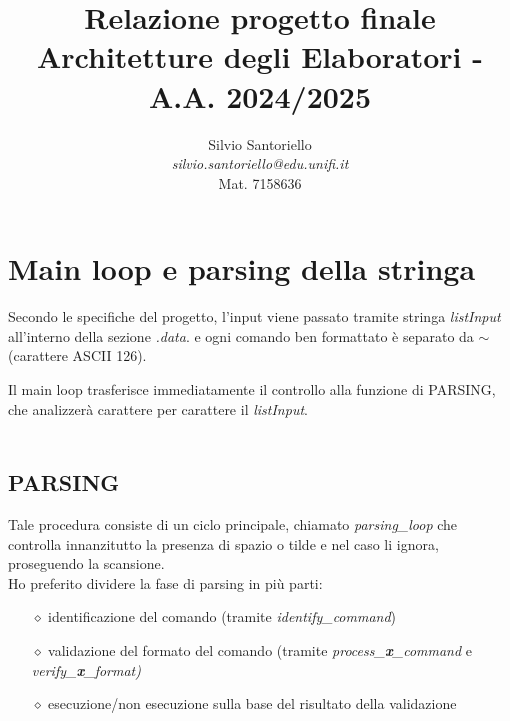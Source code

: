 \documentclass[10pt]{article}
\title{Relazione progetto finale Architetture degli Elaboratori - A.A. 2024/2025}
\date{}
\begin{document}
   
    \maketitle
    \begin{center}
        {}
    \end{center}

    \begin{center}
        \vspace{9cm}
        \author{Silvio Santoriello\\ \textit{silvio.santoriello@edu.unifi.it}
        \\ Mat. 7158636
        }
    \end{center}
    \pagestyle{plain}
    
    \newpage
    
    \section{Main loop e parsing della stringa}
    Secondo le specifiche del progetto, l'input viene passato tramite stringa \textit{listInput} all'interno della sezione \textit{.data}. e ogni comando ben formattato è separato da $\sim$ (carattere ASCII 126).

    Il main loop trasferisce immediatamente il controllo alla funzione di PARSING, che analizzerà carattere per carattere il \textit{listInput}.\\ \\

    \subsection{PARSING}

        Tale procedura consiste di un ciclo principale, chiamato \textit{parsing\_loop} che controlla innanzitutto la presenza di spazio o tilde e nel caso li ignora, proseguendo la scansione.
        \\Ho preferito dividere la fase di parsing in più parti:
        \begin{itemize}
            \item[$\diamond$] identificazione del comando (tramite \textit{identify\_command})
            \item[$\diamond$] validazione del formato del comando (tramite \textit{process\_\textbf{x}\_command} e \textit{verify\_\textbf{x}\_format)}
            \item[$\diamond$] esecuzione/non esecuzione sulla base del risultato della validazione
        \end{itemize}
\end{document}

